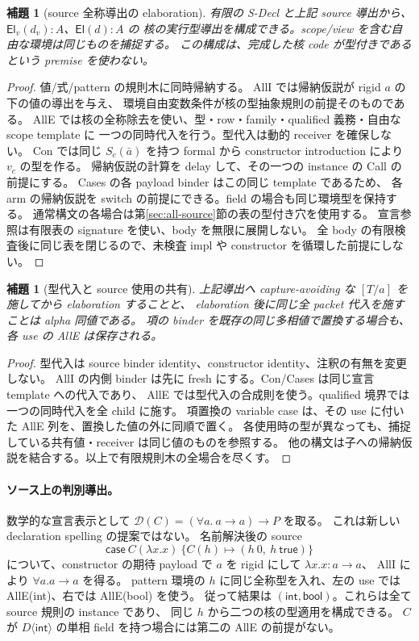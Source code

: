 \documentclass[11pt,a4paper]{article}
\newtheorem{lemma}[definition]{補題}
\newcommand{\El}{\mathsf{El}}
\newcommand{\D}{\mathcal D}
\begin{document}
\begin{lemma}[source 全称導出の elaboration]
\label{lem:source-poly}
有限の S-Decl と上記 source 導出から、\(\El_v(d_v):A\)、\(\El(d):A\) の
核の実行型導出を構成できる。scope/view を含む自由な環境は同じものを捕捉する。
この構成は、完成した核 code が型付きであるという premise を使わない。
\end{lemma}
\begin{proof}
値/式/pattern の規則木に同時帰納する。
AllI では帰納仮説が rigid \(a\) の下の値の導出を与え、
環境自由変数条件が核の型抽象規則の前提そのものである。
AllE では核の全称除去を使い、型・row・family・qualified 義務・自由な scope template に
一つの同時代入を行う。型代入は動的 receiver を確保しない。
Con では同じ \(S_c(\bar a)\) を持つ formal から constructor introduction により \(v_c\) の型を作る。
帰納仮説の計算を delay して、その一つの instance の Call の前提にする。
Cases の各 payload binder はこの同じ template であるため、
各 arm の帰納仮説を switch の前提にできる。field の場合も同じ環境型を保持する。
通常構文の各場合は第\ref{sec:all-source}節の表の型付き穴を使用する。
宣言参照は有限表の signature を使い、body を無限に展開しない。
全 body の有限検査後に同じ表を閉じるので、未検査 impl や constructor を循環した前提にしない。
\end{proof}

\begin{lemma}[型代入と source 使用の共有]
上記導出へ capture-avoiding な \([T/a]\) を施してから elaboration することと、
elaboration 後に同じ全 packet 代入を施すことは alpha 同値である。
項の binder を既存の同じ多相値で置換する場合も、各 use の AllE は保存される。
\end{lemma}
\begin{proof}
型代入は source binder identity、constructor identity、注釈の有無を変更しない。
AllI の内側 binder は先に fresh にする。Con/Cases は同じ宣言 template への代入であり、
AllE では型代入の合成則を使う。qualified 境界では一つの同時代入を全 child に施す。
項置換の variable case は、その use に付いた AllE 列を、置換した値の外に同順で置く。
各使用時の型が異なっても、捕捉している共有値・receiver は同じ値のものを参照する。
他の構文は子への帰納仮説を結合する。以上で有限規則木の全場合を尽くす。
\end{proof}

\paragraph{ソース上の判別導出。}
数学的な宣言表示として
\(\D(C)= (\forall a.\ a\to a)\to P\) を取る。
これは新しい declaration spelling の提案ではない。
名前解決後の source
\[
 \mathsf{case}\ C(\lambda x.x)\ \{C(h)\mapsto (h\ 0,\ h\ \mathsf{true})\}
\]
について、constructor の期待 payload で \(a\) を rigid にして \(\lambda x.x:a\to a\)、
AllI により \(\forall a.a\to a\) を得る。
pattern 環境の \(h\) に同じ全称型を入れ、左の use では AllE(int)、右では AllE(bool) を使う。
従って結果は \((\mathsf{int},\mathsf{bool})\)。これらは全て source 規則の instance であり、
同じ \(h\) から二つの核の型適用を構成できる。
\(C\) が \(D\langle\mathsf{int}\rangle\) の単相 field を持つ場合には第二の AllE の前提がない。
\end{document}
